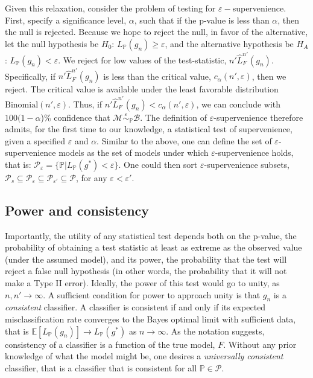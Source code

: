 \documentclass{article}
\newcommand{\conv}{\rightarrow}
\newcommand{\mB}{\mathcal{B}}
\newcommand{\mM}{\mathcal{M}}
\newcommand{\PP}{\mathbb{P}}           %
\newcommand{\EE}{\mathbb{E}}           %
\newcommand{\eps}{\varepsilon}
\providecommand{\mc}[1]{\mathcal{#1}}
\newcommand{\hL}{\widehat{L}}
\newcommand{\MeB}{\mM \overset{\varepsilon}{{\sim}}_{\PP} \mB}
\begin{document}
Given this relaxation, consider the problem of testing for $\eps-$supervenience.  First, specify a significance level, $\alpha$, such that if the p-value is less than $\alpha$, then the null is rejected.  Because we hope to reject the null, in favor of the alternative, let the null hypothesis be $H_0$: $L_{\PP}(g_n) \geq \eps$, and the alternative hypothesis be $H_A$: $L_{\PP}(g_n) < \eps$.  We reject for low values of the test-statistic, $n' \hL^{n'}_{F}(g_n)$.  Specifically, if $n' \hL^{n'}_{F}(g_n)$ is less than the critical value,  $c_{\alpha}(n',\varepsilon)$, then we reject.  The critical value is available under the least favorable distribution $\text{Binomial}(n',\varepsilon)$.  Thus, if $n' \hL^{n'}_{F}(g_n) < c_{\alpha}(n',\varepsilon)$, we can conclude with $100(1-\alpha$)\% confidence that $\MeB$.  The definition of $\eps$-supervenience therefore admits, for the first time to our knowledge, a statistical test of supervenience, given a specified $\eps$ and $\alpha$. Similar to the above, one can define the set of $\eps$-supervenience models as the set of models under which $\eps$-supervenience holds, that is: $\mc{P}_\eps = \{\PP | L_{\PP}(g^*)< \eps\}$.  One could then sort  $\eps$-supervenience subsets,  $\mc{P}_s \subseteq \mc{P}_{\eps} \subseteq \mc{P}_{\eps'} \subseteq \mc{P}$, for any $\eps < \eps'$.


\subsection{Power and consistency} %
\label{ssub:power_and_consistency}


Importantly, the utility of any statistical test depends both on the p-value, the probability of obtaining a test statistic at least as extreme as the observed value (under the assumed model), and its power, the probability that the test will reject a false null hypothesis (in other words, the probability that it will not make a Type II error).  Ideally, the power of this test would go to unity, as $n,n' \rightarrow \infty$.  A sufficient condition for power to approach unity is that $g_n$ is a \emph{consistent} classifier.  A classifier is consistent if and only if its expected misclassification rate converges to the Bayes optimal limit with sufficient data, that is $\EE[L_{\PP}(g_n)] \conv L_{\PP}(g^*)$ as $n\conv \infty$. As the notation suggests, consistency of a classifier is a function of the true model, $F$.  Without any prior knowledge of what the model might be, one desires a \emph{universally consistent} classifier, that is a classifier that is consistent for all $\PP \in \mc{P}$.  
\end{document}

